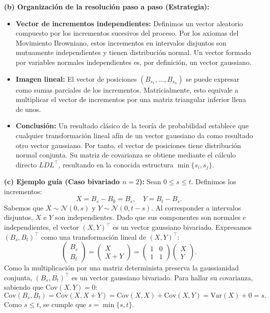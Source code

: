 \documentclass[11pt, letterpaper]{article}
\begin{document}
\begin{solucion}
    \textbf{(b) Organización de la resolución paso a paso (Estrategia):}
    \begin{itemize}
        \item[(i)] \textbf{Vector de incrementos independientes:} Definimos un vector aleatorio compuesto por los incrementos sucesivos del proceso. Por los axiomas del Movimiento Browniano, estos incrementos en intervalos disjuntos son mutuamente independientes y tienen distribución normal. Un vector formado por variables normales independientes es, por definición, un vector gaussiano.
        \item[(ii)] \textbf{Imagen lineal:} El vector de posiciones $(B_{s_1}, \dots, B_{s_n})$ se puede expresar como sumas parciales de los incrementos. Matricialmente, esto equivale a multiplicar el vector de incrementos por una matriz triangular inferior llena de unos.
        \item[(iii)] \textbf{Conclusión:} Un resultado clásico de la teoría de probabilidad establece que cualquier transformación lineal afín de un vector gaussiano da como resultado otro vector gaussiano. Por tanto, el vector de posiciones tiene distribución normal conjunta. Su matriz de covarianza se obtiene mediante el cálculo directo $L D L^\top$, resultando en la conocida estructura $\min\{s_i, s_j\}$.
    \end{itemize}

    \vspace{3mm}
    \textbf{(c) Ejemplo guía (Caso bivariado $n=2$):}
    Sean $0 \le s \le t$. Definimos los incrementos:
    \[ X = B_s - B_0 = B_s, \quad Y = B_t - B_s. \]
    Sabemos que $X \sim \mathcal{N}(0, s)$ y $Y \sim \mathcal{N}(0, t-s)$. Al corresponder a intervalos disjuntos, $X$ e $Y$ son independientes. Dado que sus componentes son normales e independientes, el vector $(X, Y)^\top$ es un vector gaussiano bivariado.
    Expresamos $(B_s, B_t)^\top$ como una transformación lineal de $(X, Y)^\top$:
    \[ 
    \begin{pmatrix} B_s \\ B_t \end{pmatrix} = \begin{pmatrix} X \\ X + Y \end{pmatrix} = \begin{pmatrix} 1 & 0 \\ 1 & 1 \end{pmatrix} \begin{pmatrix} X \\ Y \end{pmatrix}.
    \]
    Como la multiplicación por una matriz determinista preserva la gaussianidad conjunta, $(B_s, B_t)^\top$ es un vector gaussiano bivariado.
    Para hallar su covarianza, sabiendo que $\text{Cov}(X, Y) = 0$:
    \[ \text{Cov}(B_s, B_t) = \text{Cov}(X, X+Y) = \text{Cov}(X,X) + \text{Cov}(X,Y) = \text{Var}(X) + 0 = s. \]
    Como $s \le t$, se cumple que $s = \min\{s, t\}$.


\end{solucion}
\end{document}
